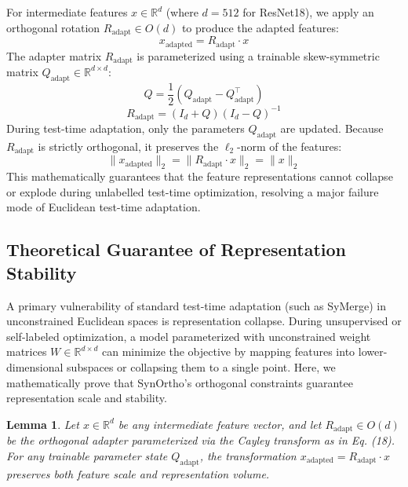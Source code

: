 \documentclass{article}
\theoremstyle{plain}
\newtheorem{lemma}[theorem]{Lemma}
\theoremstyle{definition}
\theoremstyle{remark}
\begin{document}
For intermediate features $x \in \mathbb{R}^{d}$ (where $d = 512$ for ResNet18), we apply an orthogonal rotation $R_{\text{adapt}} \in O(d)$ to produce the adapted features:
\begin{equation}
x_{\text{adapted}} = R_{\text{adapt}} \cdot x
\end{equation}
The adapter matrix $R_{\text{adapt}}$ is parameterized using a trainable skew-symmetric matrix $Q_{\text{adapt}} \in \mathbb{R}^{d \times d}$:
\begin{equation}
Q = \frac{1}{2}(Q_{\text{adapt}} - Q_{\text{adapt}}^\top)
\end{equation}
\begin{equation}
R_{\text{adapt}} = (I_d + Q)(I_d - Q)^{-1}
\end{equation}
During test-time adaptation, only the parameters $Q_{\text{adapt}}$ are updated. Because $R_{\text{adapt}}$ is strictly orthogonal, it preserves the $\ell_2$-norm of the features:
\begin{equation}
\|x_{\text{adapted}}\|_2 = \|R_{\text{adapt}} \cdot x\|_2 = \|x\|_2
\end{equation}
This mathematically guarantees that the feature representations cannot collapse or explode during unlabelled test-time optimization, resolving a major failure mode of Euclidean test-time adaptation.

\subsection{Theoretical Guarantee of Representation Stability}
A primary vulnerability of standard test-time adaptation (such as SyMerge) in unconstrained Euclidean spaces is representation collapse. During unsupervised or self-labeled optimization, a model parameterized with unconstrained weight matrices $W \in \mathbb{R}^{d \times d}$ can minimize the objective by mapping features into lower-dimensional subspaces or collapsing them to a single point. Here, we mathematically prove that SynOrtho's orthogonal constraints guarantee representation scale and stability.

\begin{lemma}
Let $x \in \mathbb{R}^d$ be any intermediate feature vector, and let $R_{\text{adapt}} \in O(d)$ be the orthogonal adapter parameterized via the Cayley transform as in Eq. (18). For any trainable parameter state $Q_{\text{adapt}}$, the transformation $x_{\text{adapted}} = R_{\text{adapt}} \cdot x$ preserves both feature scale and representation volume.
\end{lemma}
\end{document}
